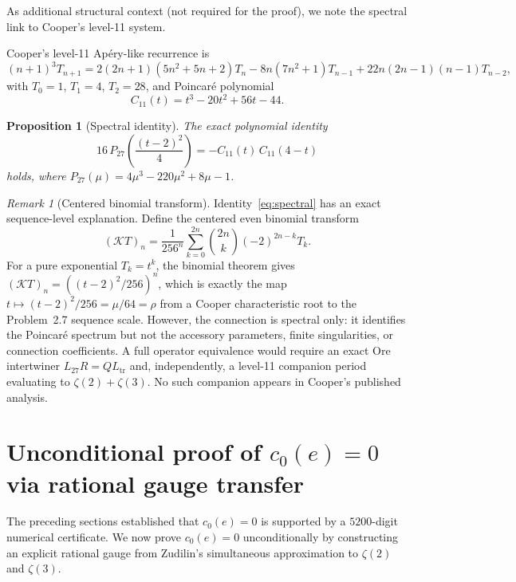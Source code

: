 \documentclass[11pt]{article}
\newtheorem{proposition}[theorem]{Proposition}
\theoremstyle{remark}
\newtheorem*{remark}{Remark}
\begin{document}
As additional structural context (not required for the proof),
we note the spectral link to Cooper's level-11 system.

Cooper's level-11 Ap\'ery-like recurrence is
\begin{equation}\label{eq:cooper}
(n+1)^3 T_{n+1} = 2(2n+1)(5n^2+5n+2)T_n
- 8n(7n^2+1)T_{n-1} + 22n(2n-1)(n-1)T_{n-2},
\end{equation}
with $T_0 = 1$, $T_1 = 4$, $T_2 = 28$, and Poincar\'e polynomial
\begin{equation}\label{eq:C11}
C_{11}(t) = t^3 - 20t^2 + 56t - 44.
\end{equation}

\begin{proposition}[Spectral identity]\label{prop:spectral}
The exact polynomial identity
\begin{equation}\label{eq:spectral}
16\,P_{27}\!\left(\frac{(t-2)^2}{4}\right)
= -C_{11}(t)\,C_{11}(4-t)
\end{equation}
holds, where $P_{27}(\mu) = 4\mu^3 - 220\mu^2 + 8\mu - 1$.
\end{proposition}

\begin{remark}[Centered binomial transform]
Identity~\eqref{eq:spectral} has an exact sequence-level
explanation. Define the centered even binomial transform
\[
(\mathcal{K}T)_n
= \frac{1}{256^n}\sum_{k=0}^{2n}\binom{2n}{k}(-2)^{2n-k}T_k.
\]
For a pure exponential $T_k = t^k$, the binomial theorem gives
$(\mathcal{K}T)_n = ((t-2)^2/256)^n$, which is exactly the
map $t \mapsto (t-2)^2/256 = \mu/64 = \rho$ from a Cooper
characteristic root to the Problem~2.7 sequence scale.
However, the connection is spectral only: it identifies the
Poincar\'e spectrum but not the accessory parameters, finite
singularities, or connection coefficients. A full operator
equivalence would require an exact Ore intertwiner
$L_{27}R = Q L_{\mathrm{tr}}$ and, independently, a level-11
companion period evaluating to $\zeta(2) + \zeta(3)$. No
such companion appears in Cooper's published analysis.
\end{remark}

\section{Unconditional proof of $c_0(e) = 0$
via rational gauge transfer}\label{sec:gauge}

The preceding sections established that $c_0(e) = 0$ is
supported by a $5200$-digit numerical certificate.
We now prove $c_0(e) = 0$ unconditionally by constructing an
explicit rational gauge from Zudilin's \cite{Zudilin2004}
simultaneous approximation to $\zeta(2)$ and $\zeta(3)$.
\end{document}
